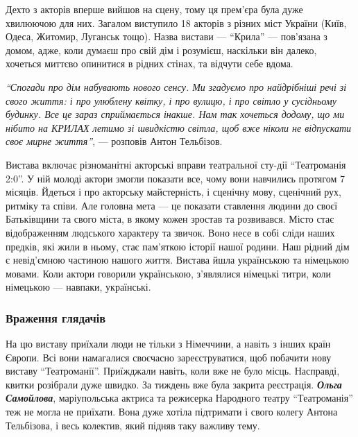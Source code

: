 Дехто з акторів вперше вийшов на сцену, тому ця прем'єра була дуже хвилюючою
для них. Загалом виступило 18 акторів з різних міст України (Київ, Одеса,
Житомир, Луганськ тощо). Назва вистави — \enquote{Крила} — пов'язана з домом, адже,
коли думаєш про свій дім і розумієш, наскільки він далеко, хочеться миттєво
опинитися в рідних стінах, та відчути себе вдома.

\begin{leftbar}
\emph{\enquote{Спогади про дім набувають нового сенсу. Ми згадуємо про найдрібніші речі зі
свого життя: і про улюблену квітку, і про вулицю, і про світло у
сусідньому будинку. Все це зараз сприймається інакше. Нам так хочеться
додому, що ми нібито на КРИЛАХ летимо зі швидкістю світла, щоб вже
ніколи не відпускати своє мирне життя}}, — розповів Антон Тельбізов.
\end{leftbar}


Вистава включає різноманітні акторські вправи театральної сту\hyp{}дії \enquote{Театроманія
2:0}. У ній молоді актори змогли показати все, чому вони навчились протягом 7
місяців. Йдеться і про акторську майстерність, і сценічну мову, сценічний рух,
ритміку та співи. Але головна мета — це показати ставлення людини до своєї
Батьківщини та свого міста, в якому кожен зростав та розвивався. Місто стає
відображенням людського характеру та звичок. Воно несе в собі сліди наших
предків, які жили в ньому, стає пам'яткою історії нашої родини. Наш рідний дім
є невід'ємною частиною нашого життя. Вистава йшла українською та німецькою
мовами. Коли актори говорили українською, з'являлися німецькі титри, коли
німецькою — навпаки, українські.


\subsubsection{Враження глядачів}

На цю виставу приїхали люди не тільки з Німеччини, а навіть з інших країн
Європи. Всі вони намагалися своєчасно зареєструватися, щоб побачити нову
виставу \enquote{Театроманії}. Приїжджали навіть, коли вже не було місць. Насправді,
квитки розібрали дуже швидко. За тиждень вже була закрита реєстрація. \emph{\textbf{Ольга
Самойлова}}, маріупольська актриса та режисерка Народного театру \enquote{Театроманія}
теж не могла не приїхати. Вона дуже хотіла підтримати і свого колегу Антона
Тельбізова, і весь колектив, який підняв таку важливу тему.

